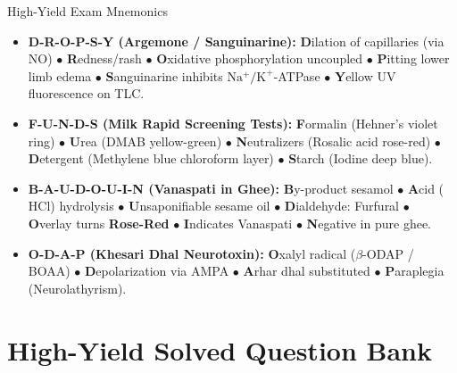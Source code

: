\documentclass[10pt,a4paper,oneside]{article}
\begin{document}
\begin{mnemonicbox}{High-Yield Exam Mnemonics}
\begin{itemize}[leftmargin=*]
    \item \textbf{D-R-O-P-S-Y (Argemone / Sanguinarine):}  
    \textbf{D}ilation of capillaries (via $\mathrm{NO}$) $\bullet$ \textbf{R}edness/rash $\bullet$ \textbf{O}xidative phosphorylation uncoupled $\bullet$ \textbf{P}itting lower limb edema $\bullet$ \textbf{S}anguinarine inhibits $\mathrm{Na^+/K^+}$-ATPase $\bullet$ \textbf{Y}ellow UV fluorescence on TLC.
    \item \textbf{F-U-N-D-S (Milk Rapid Screening Tests):}  
    \textbf{F}ormalin (Hehner's violet ring) $\bullet$ \textbf{U}rea (DMAB yellow-green) $\bullet$ \textbf{N}eutralizers (Rosalic acid rose-red) $\bullet$ \textbf{D}etergent (Methylene blue chloroform layer) $\bullet$ \textbf{S}tarch (Iodine deep blue).
    \item \textbf{B-A-U-D-O-U-I-N (Vanaspati in Ghee):}  
    \textbf{B}y-product sesamol $\bullet$ \textbf{A}cid ($\mathrm{HCl}$) hydrolysis $\bullet$ \textbf{U}nsaponifiable sesame oil $\bullet$ \textbf{D}ialdehyde: Furfural $\bullet$ \textbf{O}verlay turns \textbf{Rose-Red} $\bullet$ \textbf{I}ndicates Vanaspati $\bullet$ \textbf{N}egative in pure ghee.
    \item \textbf{O-D-A-P (Khesari Dhal Neurotoxin):}  
    \textbf{O}xalyl radical ($\beta$-ODAP / BOAA) $\bullet$ \textbf{D}epolarization via AMPA $\bullet$ \textbf{A}rhar dhal substituted $\bullet$ \textbf{P}araplegia (Neurolathyrism).
\end{itemize}
\end{mnemonicbox}

\section{High-Yield Solved Question Bank}
\end{document}
